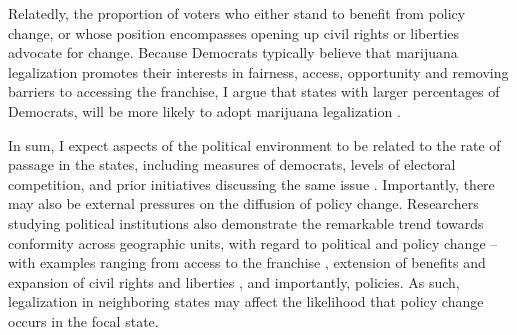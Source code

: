 
Relatedly, the proportion of voters who either stand to benefit from policy change, or whose position encompasses opening up civil rights or liberties advocate for change. Because Democrats typically believe that marijuana legalization promotes their interests in fairness, access, opportunity and removing barriers to accessing the franchise, I argue that states with larger percentages of Democrats, will be more likely to adopt marijuana legalization \citep{mccammon_et_al_2007,mccammon_et_al_2001,soule_and_olzak_2004}.


In sum, I expect aspects of the political environment to be related to the rate of passage in the states, including measures of democrats, levels of electoral competition, and prior initiatives discussing the same issue \citep{key_1957,boushey_2016}. Importantly, there may also be external pressures on the diffusion of policy change. Researchers studying political institutions also demonstrate the remarkable trend towards conformity across geographic units, with regard to political and policy change -- with examples ranging from access to the franchise \citep{uggen_and_manza_2002,manza_and_brooks_1999}, extension of benefits \citep{amenta_2006,amenta_et_al_2005} and expansion of civil rights and liberties \citep{andrews_1997}, and importantly, policies. As such, legalization in neighboring states may affect the likelihood that policy change occurs in the focal state. 



